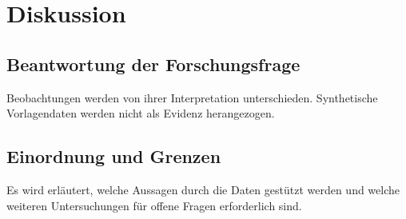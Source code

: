 \chapter{Diskussion}
\label{chap:discussion}

\section{Beantwortung der Forschungsfrage}
Beobachtungen werden von ihrer Interpretation unterschieden.
Synthetische Vorlagendaten werden nicht als Evidenz herangezogen.

\section{Einordnung und Grenzen}
Es wird erläutert, welche Aussagen durch die Daten gestützt werden und
welche weiteren Untersuchungen für offene Fragen erforderlich sind.
